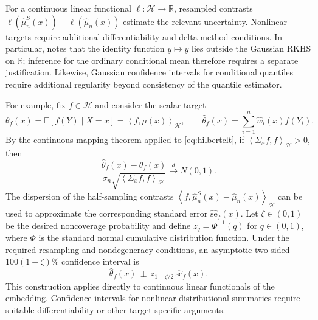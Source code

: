 \documentclass[12pt,a4paper]{article}
\newcommand{\E}{\mathbb E}
\newcommand{\R}{\mathbb R}
\newcommand{\calH}{\mathcal H}
\newcommand{\1}{\mathbf 1}
\newcommand{\ip}[2]{\left\langle#1,#2\right\rangle}
\begin{document}
For a continuous linear functional $\ell:\calH\to\R$, resampled contrasts $\ell(\widehat\mu_n^S(x))-\ell(\widehat\mu_n(x))$ estimate the relevant uncertainty. Nonlinear targets require additional differentiability and delta-method conditions. In particular, \cite[Remark~10]{naf2023} notes that the identity function $y\mapsto y$ lies outside the Gaussian RKHS on $\R$; inference for the ordinary conditional mean therefore requires a separate justification. Likewise, Gaussian confidence intervals for conditional quantiles require additional regularity beyond consistency of the quantile estimator.

For example, fix $f\in\calH$ and consider the scalar target
\[
 \theta_f(x)=\E[f(Y)\mid X=x]
 =\ip{f}{\mu(x)}_{\calH},\qquad
 \widehat\theta_f(x)=\sum_{i=1}^n\widehat w_i(x)f(Y_i).
\]
By the continuous mapping theorem applied to \eqref{eq:hilbertclt}, if
$\ip{\Sigma_x f}{f}_{\calH}>0$, then
\begin{equation}\label{eq:scalarclt}
 \frac{\widehat\theta_f(x)-\theta_f(x)}
 {\sigma_n\sqrt{\ip{\Sigma_x f}{f}_{\calH}}}
 \xrightarrow{\,d\,}N(0,1).
\end{equation}
The dispersion of the half-sampling contrasts
$\ip{f}{\widehat\mu_n^S(x)-\widehat\mu_n(x)}_{\calH}$
can be used to approximate the corresponding standard error
$\widehat{\mathrm{se}}_f(x)$. Let $\zeta\in(0,1)$ be the desired noncoverage probability and define $z_q=\Phi^{-1}(q)$ for $q\in(0,1)$, where $\Phi$ is the standard normal cumulative distribution function. Under the required resampling and
nondegeneracy conditions, an asymptotic two-sided $100(1-\zeta)\%$ confidence interval is
\begin{equation}\label{eq:scalarci}
 \widehat\theta_f(x)\ \pm\
  z_{1-\zeta/2}\,\widehat{\mathrm{se}}_f(x).
\end{equation}
This construction applies directly to continuous linear functionals of the
embedding. Confidence intervals for nonlinear distributional summaries
require suitable differentiability or other target-specific arguments.
\end{document}
